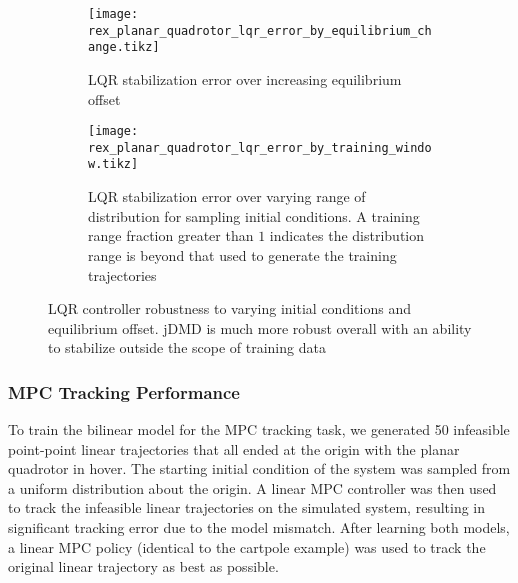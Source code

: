 \documentclass{article}
\begin{document}
\begin{figure}
	\centering
	\begin{subfigure}[t]{0.45\textwidth}
		\texttt{[image: rex\_planar\_quadrotor\_lqr\_error\_by\_equilibrium\_change.tikz]}
		\caption{LQR stabilization error over increasing equilibrium offset}
		\label{fig:rex_planar_quadrotor_lqr_error_by_equilibrium_change}
	\end{subfigure}
	\begin{subfigure}[t]{0.45\textwidth}
		\texttt{[image: rex\_planar\_quadrotor\_lqr\_error\_by\_training\_window.tikz]}
		\caption{LQR stabilization error over varying range of distribution for sampling initial conditions. A training range fraction greater than $1$ indicates the distribution range is beyond that used to generate the training trajectories}
		\label{fig:rex_planar_quadrotor_lqr_error_by_training_window}
	\end{subfigure}
	\caption{ LQR controller robustness to varying initial conditions and equilibrium offset. jDMD is much more robust overall with an ability to stabilize outside the scope of training data }
\end{figure}

\subsubsection{MPC Tracking Performance}

To train the bilinear model for the MPC tracking task, we generated 50 infeasible point-point
linear trajectories that all ended at the origin with the planar quadrotor in hover. The starting
initial condition of the system was sampled from a uniform distribution about the origin.
A linear MPC controller was then used to track the infeasible linear trajectories on the
simulated system, resulting in significant tracking error due to the model mismatch. 
After learning both models, a linear MPC policy (identical to the cartpole example) was
used to track the original linear trajectory as best as possible.
\end{document}
